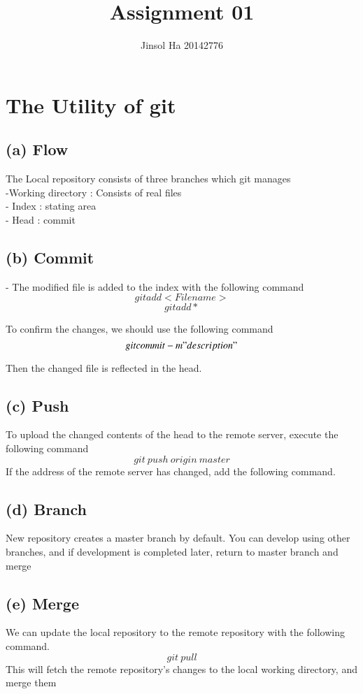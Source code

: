 \documentclass[ebook,12pt,oneside,openany]{memoir}
\title{Assignment 01}
\author{Jinsol Ha 20142776}
\begin{document}
\maketitle

\section{The Utility of git}

\subsection{(a) Flow}

The Local repository consists of three branches which git manages\\
-Working directory : Consists of real files\\
- Index : stating area\\
- Head : commit\\


\subsection{(b) Commit}
- The modified file is added to the index with the following command\\

 \[ git add <File name> \]
 \[ git add * \]

To confirm the changes, we should use the following command\\
 \[ git commit -m "description" \]

Then the changed file is reflected in the head.

\subsection{(c) Push}
To upload the changed contents of the head to the remote server, execute the following command
 \[ git \ push \ origin \ master \]
If the address of the remote server has changed, add the following command.
\subsection{(d) Branch}
New repository creates a master branch by default. You can develop using other branches, and if development is completed later, return to master branch and merge
\subsection{(e) Merge}
We can update the local repository to the remote repository with the following command.
 \[ git \ pull\]
This will fetch the remote repository's changes to the local working directory, and merge them
\end{document}
